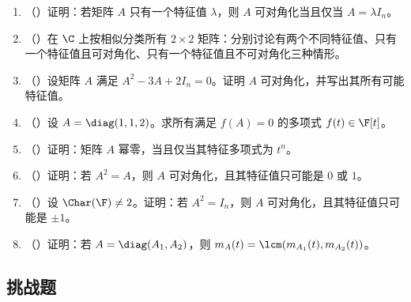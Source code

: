 \begin{enumerate}[label=\arabic*., leftmargin=2.8em, resume]
  \item （\medium）证明：若矩阵 \(A\) 只有一个特征值 \(\lambda\)，则 \(A\) 可对角化当且仅当 \(A=\lambda I_n\)。
  \item （\medium）在 \(\C\) 上按相似分类所有 \(2\times 2\) 矩阵：分别讨论有两个不同特征值、只有一个特征值且可对角化、只有一个特征值且不可对角化三种情形。
  \item （\medium）设矩阵 \(A\) 满足 \(A^2-3A+2I_n=0\)。证明 \(A\) 可对角化，并写出其所有可能特征值。
  \item （\medium）设 \(A=\diag(1,1,2)\)。求所有满足 \(f(A)=0\) 的多项式 \(f(t)\in \F[t]\)。
  \item （\medium）证明：矩阵 \(A\) 幂零，当且仅当其特征多项式为 \(t^n\)。
  \item （\medium）证明：若 \(A^2=A\)，则 \(A\) 可对角化，且其特征值只可能是 \(0\) 或 \(1\)。
  \item （\medium）设 \(\Char(\F)\neq 2\)。证明：若 \(A^2=I_n\)，则 \(A\) 可对角化，且其特征值只可能是 \(\pm 1\)。
  \item （\medium）证明：若 \(A=\diag(A_1,A_2)\)，则 \(m_A(t)=\lcm(m_{A_1}(t),m_{A_2}(t))\)。
\end{enumerate}

\subsection*{挑战题}

